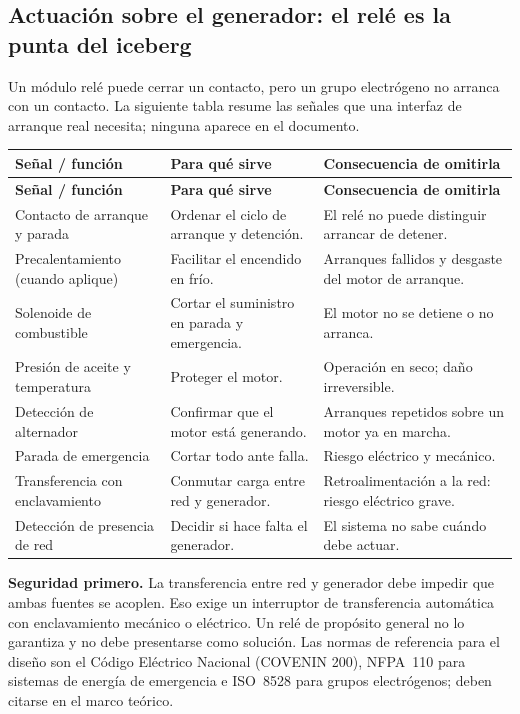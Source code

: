 \documentclass[11pt,a4paper]{article}
\begin{document}
\subsection{Actuación sobre el generador: el relé es la punta del iceberg}

Un módulo relé puede cerrar un contacto, pero un grupo electrógeno no arranca con un contacto. La siguiente tabla resume las señales que una interfaz de arranque real necesita; ninguna aparece en el documento.

\begingroup\small
\begin{longtable}{@{}>{\raggedright\arraybackslash}p{3.6cm} >{\raggedright\arraybackslash}p{5.4cm} >{\raggedright\arraybackslash}p{6.6cm}@{}}
\toprule
\textbf{Señal / función} & \textbf{Para qué sirve} & \textbf{Consecuencia de omitirla} \\
\midrule
\endfirsthead
\toprule
\textbf{Señal / función} & \textbf{Para qué sirve} & \textbf{Consecuencia de omitirla} \\
\midrule
\endhead
Contacto de arranque y parada & Ordenar el ciclo de arranque y detención. & El relé no puede distinguir arrancar de detener. \\
Precalentamiento (cuando aplique) & Facilitar el encendido en frío. & Arranques fallidos y desgaste del motor de arranque. \\
Solenoide de combustible & Cortar el suministro en parada y emergencia. & El motor no se detiene o no arranca. \\
Presión de aceite y temperatura & Proteger el motor. & Operación en seco; daño irreversible. \\
Detección de alternador & Confirmar que el motor está generando. & Arranques repetidos sobre un motor ya en marcha. \\
Parada de emergencia & Cortar todo ante falla. & Riesgo eléctrico y mecánico. \\
Transferencia con enclavamiento & Conmutar carga entre red y generador. & Retroalimentación a la red: riesgo eléctrico grave. \\
Detección de presencia de red & Decidir si hace falta el generador. & El sistema no sabe cuándo debe actuar. \\
\bottomrule
\end{longtable}
\endgroup

\begin{cajaRecuerda}
\textbf{Seguridad primero.} La transferencia entre red y generador debe impedir que ambas fuentes se acoplen. Eso exige un interruptor de transferencia automática con enclavamiento mecánico o eléctrico. Un relé de propósito general no lo garantiza y no debe presentarse como solución. Las normas de referencia para el diseño son el Código Eléctrico Nacional (COVENIN 200), NFPA~110 para sistemas de energía de emergencia e ISO~8528 para grupos electrógenos; deben citarse en el marco teórico.
\end{cajaRecuerda}
\end{document}
